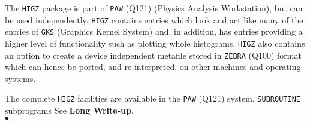                          
                      
\Submitter{}                             
                
The {\tt HIGZ} package is part of {\tt PAW} (Q121) (Physics Analysis
Workstation), but can be used independently.
{\tt HIGZ} contains entries which look and act like many of the entries
of {\tt GKS} (Graphics Kernel System) and, in addition, has
entries providing a higher level of functionality such as plotting
whole histograms. {\tt HIGZ} also contains an option to create a device
independent metafile stored in {\tt ZEBRA} (Q100) format which can
hence be ported, and re-interpreted, on other machines and operating
systems.
\par
The complete {\tt HIGZ} facilities are available in the {\tt PAW}
(Q121) system.
\Structure
{\tt SUBROUTINE} subprograms
\Usage
See {\bf Long Write-up}.
\\ $\bullet$
